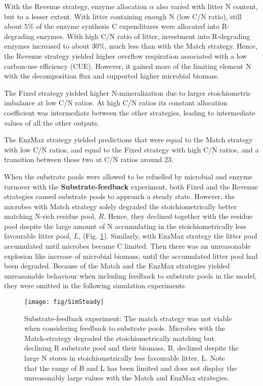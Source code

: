 With the Revenue strategy, enzyme allocation $\alpha$ also varied with litter N
content, but to a lesser extent.
With litter containing enough N (low C/N ratio), still about 5\% of the enzyme
synthesis C expenditures were allocated into R-degrading enzymes. 
With high C/N ratio of litter, investment into R-degrading enzymes increased to
about 30\%, much less than with the Match strategy. Hence, the Revenue strategy
yielded higher overflow respiration associated with a low carbon-use
efficiency (CUE). However, it gained more of the limiting element N with the
decomposition flux and supported higher microbial biomass. 

The Fixed strategy yielded higher N-mineralization due to larger stoichiometric
imbalance at low C/N ratios.
At high C/N ratios its constant allocation coefficient was intermediate between
the other strategies, leading to intermediate values of all the other outputs.

The EnzMax strategy yielded predictions that were equal to the Match strategy
with low C/N ratios, and equal to the Fixed strategy with high C/N ratios, and a
transition between those two at C/N ratios around 23.


When the substrate pools were allowed to be refuelled by microbial and enzyme
turnover with the \textbf{Substrate-feedback} experiment, both Fixed and the
Revenue strategies caused substrate pools to approach a steady state.
However, the microbes with Match strategy solely degraded the stoichiometrically
better matching N-rich residue pool, $R$. Hence, they declined together with the
residue pool despite the large amount of N accumulating in the
stoichiometrically less favourable litter pool, $L$, (Fig. \ref{fig:SimSteady}).
Similarly, with EnzMax strategy the litter pool accumulated until microbes
became C limited. Then there was an unreasonable explosion like increase of
microbial biomass, until the accumulated litter pool had been degraded.
Because of the Match and the EnzMax strategies yielded unreasonable behaviour
when including feedback to substrate pools in the model, they were omitted in
the following simulation experiments.

\begin{figure}[t]
\vspace*{2mm}
\begin{center} 
\texttt{[image: fig/SimSteady]} 
\end{center}
\caption{
Substrate-feedback experiment: The match strategy was not viable when
considering feedback to substrate pools. Microbes
with the Match-strategy degraded the stoichiometrically matching but declining R
substrate pool and their biomass, B, declined despite the large N stores in
stoichiometrically less favourable litter, L. Note that the range of B and L has
been limited and does not display the unreasonably large values with the Match
and EnzMax strategies.
\label{fig:SimSteady}} 
\end{figure}

